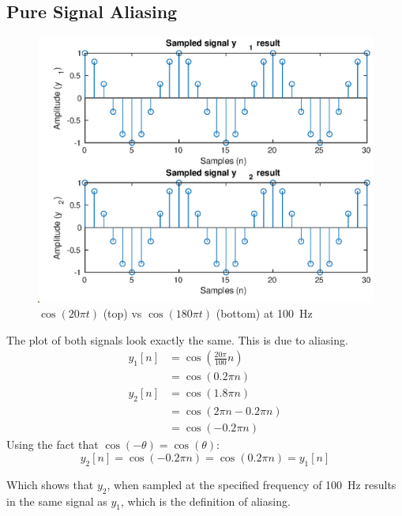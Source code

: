 \documentclass{article}
\begin{document}
\begin{multicols}{2}
    \subsection{Pure Signal Aliasing}
    \begin{figure}[H]
        \centering
        \includegraphics[width=\linewidth]{plot4}
        \caption{\(\cos(20\pi t)\) (top) vs \(\cos(180\pi t)\) (bottom) at \SI{100}{\hertz} }
    \end{figure}
    The plot of both signals look exactly the same. This is due to aliasing.
    \begin{align*}
        y_1[n] & = \cos\left(\frac{20\pi}{100}n\right) \\
               & = \cos\left(0.2\pi n\right)           \\
        y_2[n] & = \cos\left(1.8\pi n\right)           \\
               & = \cos\left(2\pi n- 0.2\pi n\right)   \\
               & = \cos\left(-0.2\pi n\right)
    \end{align*}
    Using the fact that \(\cos(-\theta) = \cos(\theta)\):
    \[y_2[n]  = \cos\left(-0.2\pi n\right) = \cos(0.2\pi n) = y_1[n]\]

    Which shows that \(y_2\), when sampled at the specified frequency of \SI{100}{\hertz} results in the same signal as \(y_1\), which is the definition of aliasing.


\end{multicols}
\end{document}
